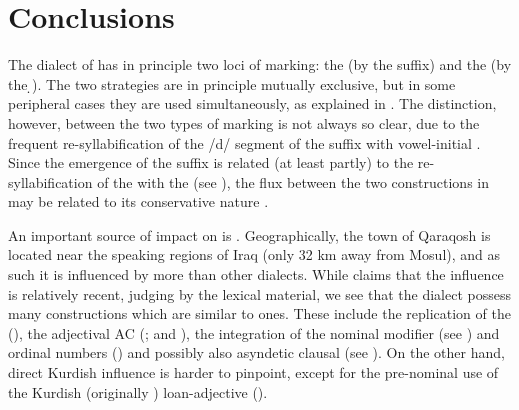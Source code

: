 \section{Conclusions}

The dialect of \Qar has in principle two {loci} of marking: the \prim (by the \cst* \ed suffix) and the \secn (by the \d \lnk*). The two strategies are in principle mutually exclusive, but in some peripheral cases they are used simultaneously, as explained in  . The distinction, however, between the two types of marking is not always so clear, due to the frequent re-syllabification of the \ph/d/ segment of the \cst* suffix with vowel-initial \secns. Since the emergence of the \cst* suffix is related (at least partly) to the  re-syllabification of the \lnk* with the \prim (see ), the flux between the two constructions in \Qar may be related to its conservative nature \citep[10]{KhanQaraqosh}.




An important source of impact on \Qar is . Geographically, the town of Qaraqosh is located near the  speaking regions of Iraq (only 32 km away from Mosul), and as such it is influenced by  more than other dialects.  While \citet[9]{KhanQaraqosh} claims that the  influence is relatively recent, judging by the lexical material, we see that the dialect possess many constructions which are similar to  ones. These include the replication of the   (), the  adjectival AC (;  and ), the integration of the  nominal modifier  (see ) and ordinal numbers ()  and possibly also asyndetic clausal \secns (see ). On the other hand, direct Kurdish influence is harder to pinpoint, except for the pre-nominal use of the Kurdish (originally ) loan-adjective  ().







	